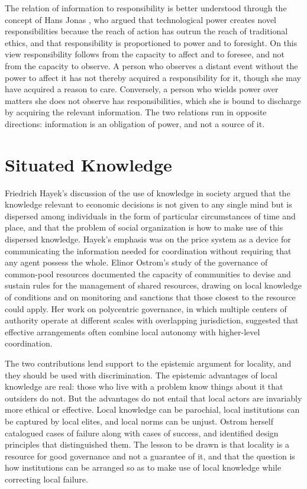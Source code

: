 \documentclass[11pt]{report}
\theoremstyle{definition}
\theoremstyle{remark}
\begin{document}
The relation of information to responsibility is better understood through the concept of Hans Jonas \cite{jonas}, who argued that technological power creates novel responsibilities because the reach of action has outrun the reach of traditional ethics, and that responsibility is proportioned to power and to foresight. On this view responsibility follows from the capacity to affect and to foresee, and not from the capacity to observe. A person who observes a distant event without the power to affect it has not thereby acquired a responsibility for it, though she may have acquired a reason to care. Conversely, a person who wields power over matters she does not observe has responsibilities, which she is bound to discharge by acquiring the relevant information. The two relations run in opposite directions: information is an obligation of power, and not a source of it.

\section{Situated Knowledge}

Friedrich Hayek's discussion of the use of knowledge in society \cite{hayek} argued that the knowledge relevant to economic decisions is not given to any single mind but is dispersed among individuals in the form of particular circumstances of time and place, and that the problem of social organization is how to make use of this dispersed knowledge. Hayek's emphasis was on the price system as a device for communicating the information needed for coordination without requiring that any agent possess the whole. Elinor Ostrom's study of the governance of common-pool resources \cite{ostrom} documented the capacity of communities to devise and sustain rules for the management of shared resources, drawing on local knowledge of conditions and on monitoring and sanctions that those closest to the resource could apply. Her work on polycentric governance, in which multiple centers of authority operate at different scales with overlapping jurisdiction, suggested that effective arrangements often combine local autonomy with higher-level coordination.

The two contributions lend support to the epistemic argument for locality, and they should be used with discrimination. The epistemic advantages of local knowledge are real: those who live with a problem know things about it that outsiders do not. But the advantages do not entail that local actors are invariably more ethical or effective. Local knowledge can be parochial, local institutions can be captured by local elites, and local norms can be unjust. Ostrom herself catalogued cases of failure along with cases of success, and identified design principles that distinguished them. The lesson to be drawn is that locality is a resource for good governance and not a guarantee of it, and that the question is how institutions can be arranged so as to make use of local knowledge while correcting local failure.
\end{document}
